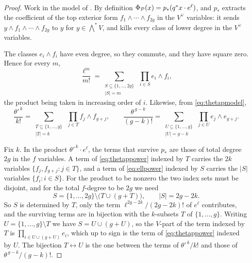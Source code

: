 \begin{proof}
Work in the model of . By definition
$\Phi_{\mathcal{P}}(x)=p_{*}(q^{*}x\cdot e^{\ell})$, and $p_{*}$ extracts the
coefficient of the top exterior form $f_{1}\wedge\cdots\wedge f_{2g}$ in the
$V^{\vee}$ variables: it sends $y\wedge f_{1}\wedge\cdots\wedge f_{2g}$ to
$y$ for $y\in\bigwedge^{*}V$, and kills every class of lower degree in the
$V^{\vee}$ variables.

The classes $e_{i}\wedge f_{i}$ have even degree, so they commute, and they
have square zero. Hence for every $m$,
\begin{equation}\label{eq:ellpower}
  \frac{\ell^{m}}{m!}
  =\sum_{\substack{S\subseteq\{1,\dots,2g\}\\ |S|=m}}\ \prod_{i\in S}e_{i}\wedge f_{i},
\end{equation}
the product being taken in increasing order of $i$. Likewise, from
\eqref{eq:thetapmodel},
\begin{equation}\label{eq:thetappower}
  \frac{\theta'^{\,k}}{k!}
  =\sum_{\substack{T\subseteq\{1,\dots,g\}\\ |T|=k}}\ \prod_{j\in T}f_{j}\wedge f_{g+j},
  \qquad
  \frac{\theta^{\,g-k}}{(g-k)!}
  =\sum_{\substack{U\subseteq\{1,\dots,g\}\\ |U|=g-k}}\ \prod_{j\in U}e_{j}\wedge e_{g+j}.
\end{equation}

Fix $k$. In the product $\theta'^{\,k}\cdot e^{\ell}$, the terms that survive
$p_{*}$ are those of total degree $2g$ in the $f$ variables. A term of
\eqref{eq:thetappower} indexed by $T$ carries the $2k$ variables
$\{f_{j},f_{g+j}:j\in T\}$, and a term of \eqref{eq:ellpower} indexed by $S$
carries the $|S|$ variables $\{f_{i}:i\in S\}$. For the product to be nonzero
the two index sets must be disjoint, and for the total $f$-degree to be $2g$
we need
\[
  S=\{1,\dots,2g\}\setminus\bigl(T\cup(g+T)\bigr),
  \qquad |S|=2g-2k .
\]
So $S$ is determined by $T$, only the term $\ell^{2g-2k}/(2g-2k)!$ of
$e^{\ell}$ contributes, and the surviving terms are in bijection with the
$k$-subsets $T$ of $\{1,\dots,g\}$. Writing $U=\{1,\dots,g\}\setminus T$ we
have $S=U\cup(g+U)$, so the $V$-part of the term indexed by $T$ is
$\prod_{i\in U\cup(g+U)}e_{i}$, which up to sign is the term of
\eqref{eq:thetappower} indexed by $U$. The bijection $T\leftrightarrow U$ is
the one between the terms of $\theta'^{\,k}/k!$ and those of
$\theta^{\,g-k}/(g-k)!$.


\end{proof}
